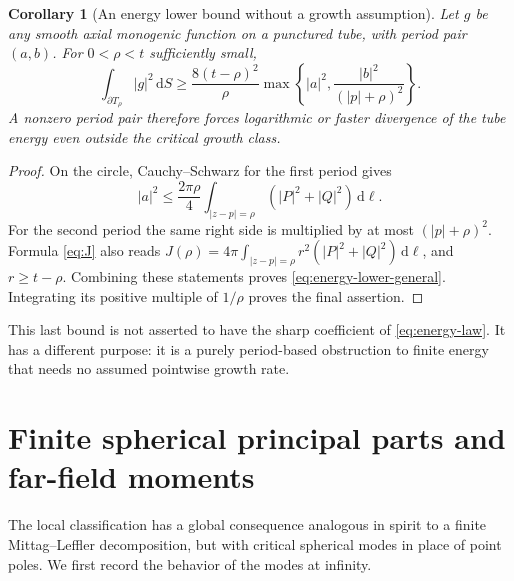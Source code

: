 \documentclass[11pt,a4paper]{article}
\numberwithin{equation}{section}
\newtheorem{corollary}[theorem]{Corollary}
\theoremstyle{definition}
\theoremstyle{remark}
\newcommand{\dd}{\,\mathrm d}
\begin{document}
\begin{corollary}[An energy lower bound without a growth assumption]
\label{cor:energy-lower-general}
Let $g$ be any smooth axial monogenic function on a punctured tube, with
period pair $(a,b)$. For $0<\rho<t$ sufficiently small,
\begin{equation}
 \int_{\partial T_\rho}|g|^2\dd S
 \ge \frac{8(t-\rho)^2}{\rho}
       \max\left\{|a|^2,\frac{|b|^2}{(|p|+\rho)^2}\right\}.
 \label{eq:energy-lower-general}
\end{equation}
A nonzero period pair therefore forces logarithmic or faster divergence
of the tube energy even outside the critical growth class.
\end{corollary}
\begin{proof}
On the circle, Cauchy--Schwarz for the first period gives
\[
 |a|^2\le\frac{2\pi\rho}{4}
                 \int_{|z-p|=\rho}(|P|^2+|Q|^2)\dd\ell.
\]
For the second period the same right side is multiplied by at most
$(|p|+\rho)^2$. Formula \eqref{eq:J} also reads
$J(\rho)=4\pi\int_{|z-p|=\rho}r^2(|P|^2+|Q|^2)\dd\ell$,
and $r\ge t-\rho$. Combining these statements proves
\eqref{eq:energy-lower-general}. Integrating its positive multiple of
$1/\rho$ proves the final assertion.
\end{proof}
This last bound is not asserted to have the sharp coefficient of
\eqref{eq:energy-law}. It has a different purpose: it is a purely
period-based obstruction to finite energy that needs no assumed
pointwise growth rate.

\section{Finite spherical principal parts and far-field moments}
\label{sec:principal-parts}
The local classification has a global consequence analogous in spirit to a
finite Mittag--Leffler decomposition, but with critical spherical modes in
place of point poles. We first record the behavior of the modes at infinity.
\end{document}
